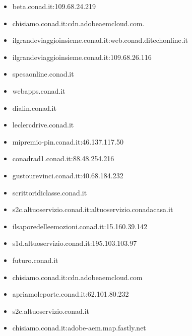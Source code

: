 \documentclass{article}
\begin{document}
\begin{itemize}
        \item beta.conad.it:109.68.24.219
    
        \item chisiamo.conad.it:cdn.adobeaemcloud.com.
    
        \item ilgrandeviaggioinsieme.conad.it:web.conad.ditechonline.it
    
        \item ilgrandeviaggioinsieme.conad.it:109.68.26.116
    
        \item spesaonline.conad.it
    
        \item webapps.conad.it
    
        \item dialin.conad.it
    
        \item leclercdrive.conad.it
    
        \item mipremio-pin.conad.it:46.137.117.50
    
        \item conadrad1.conad.it:88.48.254.216
    
        \item gustourevinci.conad.it:40.68.184.232
    
        \item scrittoridiclasse.conad.it
    
        \item s2c.altuoservizio.conad.it:altuoservizio.conadacasa.it
    
        \item ilsaporedelleemozioni.conad.it:15.160.39.142
    
        \item s1d.altuoservizio.conad.it:195.103.103.97
    
        \item futuro.conad.it
    
        \item chisiamo.conad.it:cdn.adobeaemcloud.com
    
        \item apriamoleporte.conad.it:62.101.80.232
    
        \item s2c.altuoservizio.conad.it
    
        \item chisiamo.conad.it:adobe-aem.map.fastly.net
    

\end{itemize}
\end{document}
